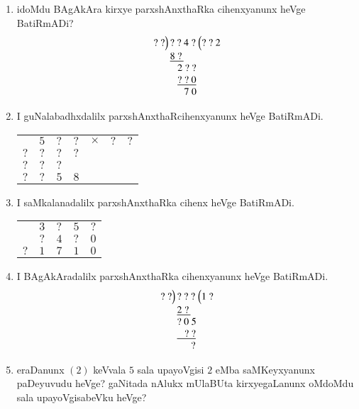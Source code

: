\begin{enumerate}
\item idoMdu BAgAkAra kirxye parxshAnxthaRka cihenxyanunx heVge BatiRmADi?
$$
\begin{array}{r@{\,}l@{\,}l}
?~?\Big) & ?~?~4~? & \Big(?~?~2\\
         & \underline{8~?\,} & \\
         & ~~~2~?~?\\
         & ~~~\underline{?~?~0}\\
         & ~\,~~~~7~0
\end{array}
$$

\item I guNalabadhxdalilx parxshAnxthaRcihenxyanunx heVge BatiRmADi.
\begin{center}
\begin{tabular}{ccccccc}
 & $5$ & $?$ & $?$ & $\times$ & $?$ & $?$\\
\cline{2-7}
$?$ & $?$ & $?$ & $?$ & & &\\
$?$ & $?$ & $?$ &  & & &\\
\cline{1-5}
$?$ & $?$ & $5$ & $8$ & & &
\end{tabular}
\end{center}

\item I saMkalanadalilx parxshAnxthaRka cihenx heVge BatiRmADi.
\begin{center}
\begin{tabular}{ccccc}
 & $3$ & $?$ & $5$ & $?$\\
 & $?$ & $4$ & $?$ & $0$\\
\cline{2-5}
$?$ & $1$ & $7$ & $1$ & $0$
\end{tabular}
\end{center}

\item I BAgAkAradalilx parxshAnxthaRka cihenxyanunx heVge BatiRmADi.
$$
\begin{array}{r@{\,}l@{\,}l}
?~?\Big) & ?~?~? & \Big(1~?\\
         & \underline{2~?\,} & \\
         & ?~0~5\\
         & \underline{~~~?~?}\\
         & ~\,~~~~?
\end{array}
$$

\item eraDanunx $(2)$ keVvala $5$ sala upayoVgisi $2$ eMba saMKeyxyanunx paDeyuvudu heVge? gaNitada nAlukx mUlaBUta kirxyegaLanunx oMdoMdu sala upayoVgisabeVku heVge?


\end{enumerate}
